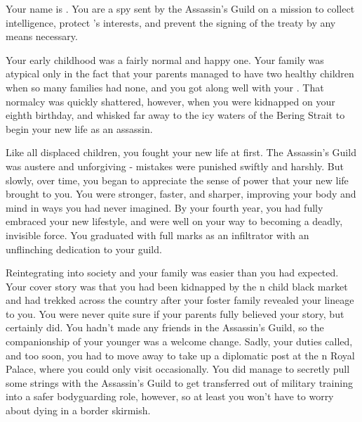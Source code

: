 \documentclass[char]{NeptuneBall}
\begin{document}
\name{\cSpy{}}

Your name is \cSpy{}. You are a spy sent by the Assassin's Guild on a mission to collect intelligence, protect \pPacifica{}'s interests, and prevent the signing of the treaty by any means necessary.

Your early childhood was a fairly normal and happy one. Your family was atypical only in the fact that your parents managed to have two healthy children when so many families had none, and you got along well with your \cBodyguard{\sibling} \cBodyguard{}. That normalcy was quickly shattered, however, when you were kidnapped on your eighth birthday, and whisked far away to the icy waters of the Bering Strait to begin your new life as an assassin.

Like all displaced children, you fought your new life at first. The Assassin's Guild was austere and unforgiving - mistakes were punished swiftly and harshly. But slowly, over time, you began to appreciate the sense of power that your new life brought to you. You were stronger, faster, and sharper, improving your body and mind in ways you had never imagined. By your fourth year, you had fully embraced your new lifestyle, and were well on your way to becoming a deadly, invisible force. You graduated with full marks as an infiltrator with an unflinching dedication to your guild.

Reintegrating into society and your family was easier than you had expected. Your cover story was that you had been kidnapped by the \pPacifica{}n child black market and had trekked across the country after your foster family revealed your lineage to you. You were never quite sure if your parents fully believed your story, but \cBodyguard{} certainly did. You hadn't made any friends in the Assassin's Guild, so the companionship of your younger \cBodyguard{\sibling} was a welcome change. Sadly, your duties called, and too soon, you had to move away to take up a diplomatic post at the \pPacifica{}n Royal Palace, where you could only visit \cBodyguard{\them} occasionally. You did manage to secretly pull some strings with the Assassin's Guild to get \cBodyguard{\them} transferred out of military training into a safer bodyguarding role, however, so at least you won't have to worry about \cBodyguard{\them} dying in a border skirmish.
\end{document}
